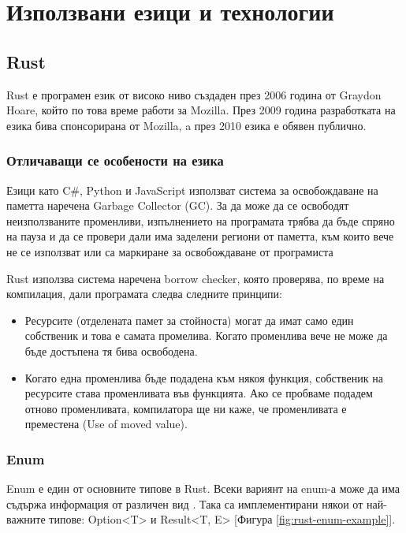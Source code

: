 \section{Използвани езици и технологии}

\subsection{Rust}
Rust е програмен език от високо ниво създаден през 2006 година от Graydon
Hoare, който по това време работи за Mozilla. През 2009 година разработката на
езика бива спонсорирана от Mozilla, a през 2010 езика е обявен публично.
\cite{Rust_Origins_Wikipedia}

\subsubsection{Отличаващи се особености на езика}

Езици като C\#, Python и JavaScript използват система за освобождаване на паметта
наречена Garbage Collector (GC). За да може да се освободят неизползваните
променливи, изпълнението на програмата трябва да бъде спряно на пауза и да се
провери дали има заделени региони от паметта, към които вече не се използват
или са маркиране за освобождаване от програмиста \cite{Garbage_Collection_Wikipedia}

Rust използва система наречена borrow checker, която проверява, по време на
компилация, дали програмата следва следните принципи:

\begin{itemize}

\item Ресурсите (отделената памет за стойноста) могат да имат само един
собственик и това е самата промелива. Когато променлива вече не може да бъде
достъпена тя бива освободена.

\item Когато една променлива бъде подадена към някоя функция, собственик на
ресурсите става променливата във функцията. Ако се пробваме подадем отново
променливата, компилатора ще ни каже, че променливата е преместена (Use of
moved value).

\end{itemize}

\subsubsection{Enum}
Enum е един от основните типове в Rust. Всеки вариянт на enum-а може да има съдържа информация от различен вид \cite{Rust_Enums}. Така са имплементирани някои от най-важните типове: Option<T> и Result<T, E> [Фигура \ref{fig:rust-enum-example}].


